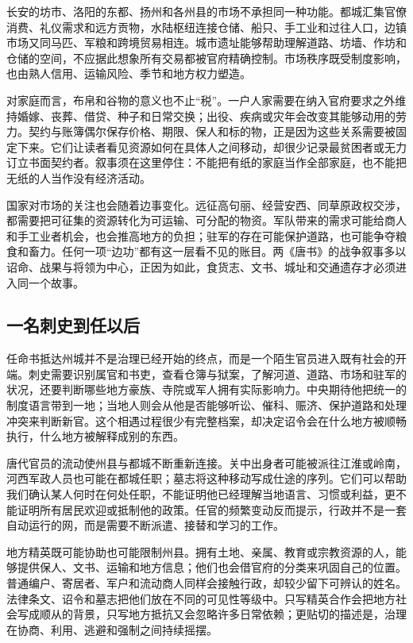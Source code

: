 长安的坊市、洛阳的东都、扬州和各州县的市场不承担同一种功能。都城汇集官僚消费、礼仪需求和远方贡物，水陆枢纽连接仓储、船只、手工业和过往人口，边镇市场又同马匹、军粮和跨境贸易相连。城市遗址能够帮助理解道路、坊墙、作坊和仓储的空间，不应据此想象所有交易都被官府精确控制。市场秩序既受制度影响，也由熟人信用、运输风险、季节和地方权力塑造。

对家庭而言，布帛和谷物的意义也不止“税”。一户人家需要在纳入官府要求之外维持婚嫁、丧葬、借贷、种子和日常交换；出役、疾病或灾年会改变其能够动用的劳力。契约与账簿偶尔保存价格、期限、保人和标的物，正是因为这些关系需要被固定下来。它们让读者看见资源如何在具体人之间移动，却很少记录最贫困者或无力订立书面契约者。叙事须在这里停住：不能把有纸的家庭当作全部家庭，也不能把无纸的人当作没有经济活动。

国家对市场的关注也会随着边事变化。远征高句丽、经营安西、同草原政权交涉，都需要把可征集的资源转化为可运输、可分配的物资。军队带来的需求可能给商人和手工业者机会，也会推高地方的负担；驻军的存在可能保护道路，也可能争夺粮食和畜力。任何一项“边功”都有这一层看不见的账目。两《唐书》的战争叙事多以诏命、战果与将领为中心，正因为如此，食货志、文书、城址和交通遗存才必须进入同一个故事。

\subsection{一名刺史到任以后}
任命书抵达州城并不是治理已经开始的终点，而是一个陌生官员进入既有社会的开端。刺史需要识别属官和书吏，查看仓簿与狱案，了解河道、道路、市场和驻军的状况，还要判断哪些地方豪族、寺院或军人拥有实际影响力。中央期待他把统一的制度语言带到一地；当地人则会从他是否能够听讼、催科、赈济、保护道路和处理冲突来判断新官。这个相遇过程很少有完整档案，却决定诏令会在什么地方被顺畅执行，什么地方被解释成别的东西。

唐代官员的流动使州县与都城不断重新连接。关中出身者可能被派往江淮或岭南，河西军政人员也可能在都城任职；墓志将这种移动写成仕途的序列。它们可以帮助我们确认某人何时在何处任职，不能证明他已经理解当地语言、习惯或利益，更不能证明所有居民欢迎或抵制他的政策。任官的频繁变动反而提示，行政并不是一套自动运行的网，而是需要不断派遣、接替和学习的工作。

地方精英既可能协助也可能限制州县。拥有土地、亲属、教育或宗教资源的人，能够提供保人、文书、运输和地方信息；他们也会借官府的分类来巩固自己的位置。普通编户、寄居者、军户和流动商人同样会接触行政，却较少留下可辨认的姓名。法律条文、诏令和墓志把他们放在不同的可见性等级中。只写精英合作会把地方社会写成顺从的背景，只写地方抵抗又会忽略许多日常依赖；更贴切的描述是，治理在协商、利用、逃避和强制之间持续摇摆。

